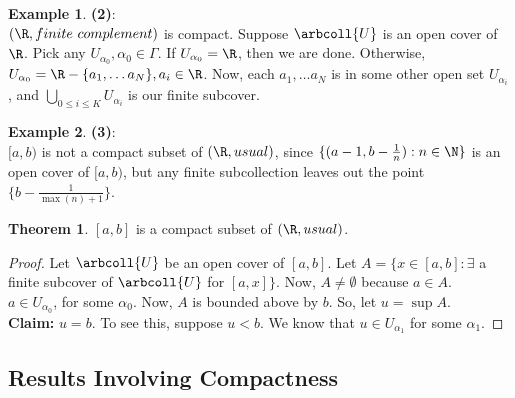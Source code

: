 \documentclass[a5paper]{article}
\theoremstyle{definition}%
\newtheorem{theorem}{Theorem}
\newtheorem*{example*}{Example}
\numberwithin{exercise}{section}
\theoremstyle{remark}%
\begin{document}
\begin{example*}\textbf{(2)}:\\
$(\R,finite\ complement)$ is compact. Suppose $\arbcoll{U}$ is an open cover of $\R$. Pick any $U_{\alpha_0}, \alpha_0\in\Gamma$. If $U_{\alpha_0}=\R$, then we are done. Otherwise, $U_{\alpha_0}=\R-\{a_1, \ldots a_N\}, a_i\in \R$. Now, each $a_1, \ldots a_N$ is in some other open set $U_{\alpha_i}$, and $\bigcup\limits_{0\leq i \leq K} U_{\alpha_i}$ is our finite subcover. 
\end{example*}

\begin{example*}\textbf{(3)}:\\
$[a,b)$ is not a compact subset of $(\R, usual)$, since $\{(a-1,b-\frac{1}{n}):n\in\N\}$ is an open cover of $[a,b)$, but any finite subcollection leaves out the point $\{b-\frac{1}{\max(n)+1}\}$. 
\end{example*}

\begin{highlight}
\begin{theorem}
$[a,b]$ is a compact subset of $(\R, usual)$.
\end{theorem}
\end{highlight}
\begin{proof}
Let $\arbcoll{U}$ be an open cover of $[a,b]$. Let $A=\{x\in[a,b] : \exists$ a finite subcover of $\arbcoll{U}$ for $[a,x]\}$. Now, $A\neq\emptyset$ because $a\in A$. \\
$a\in U_{\alpha_0}$, for some $\alpha_0$. Now, $A$ is bounded above by $b$. So, let $u=\sup A$. \\
\textbf{Claim:} $u=b$. To see this, suppose $u<b$. We know that $u\in U_{\alpha_1}$ for some ${\alpha_1}$.
\end{proof}

\subsection{Results Involving Compactness}
\end{document}
